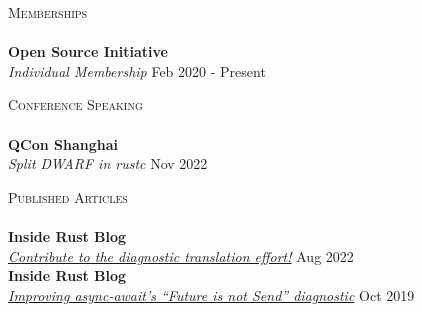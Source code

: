 \documentclass[a4paper]{article}
\newcommand{\lineunder} {
  \vspace*{-8pt} \\
  \hspace*{-18pt} \hrulefill \\
}
\newcommand{\header} [1] {
  {\hspace*{-18pt}\vspace*{6pt} \textsc{#1}}
  \vspace*{-6pt} \lineunder
}
\begin{document}
\header{Memberships}
\textbf{Open Source Initiative} \\
\textit{Individual Membership} \hfill {\color{gray} Feb 2020 - Present} \\
\vspace{2mm}

\header{Conference Speaking}
\textbf{QCon Shanghai} \\
\textit{Split DWARF in rustc} \hfill {\color{gray} Nov 2022} \\
\vspace{2mm}

\header{Published Articles}
\textbf{Inside Rust Blog} \\
\textit{\href{https://blog.rust-lang.org/inside-rust/2022/08/16/diagnostic-effort.html}{Contribute to the diagnostic translation effort!}} \hfill {\color{gray} Aug 2022} \\
\textbf{Inside Rust Blog} \\
\textit{\href{https://blog.rust-lang.org/inside-rust/2019/10/11/AsyncAwait-Not-Send-Error-Improvements.html}{Improving async-await's ``Future is not Send'' diagnostic}} \hfill {\color{gray} Oct 2019} \\
\vspace{2mm}
\end{document}
